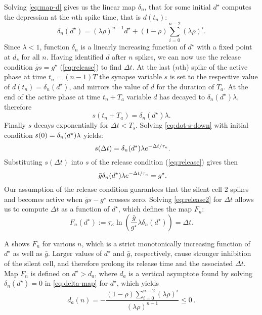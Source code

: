 Solving \cref{eq:map-d} gives us the linear map $\delta_n$, that for some initial $d^\star$ computes the depression at the $n$th spike time, that is $d(t_n)$:
\begin{equation}
	\label{eq:delta-map}
	\delta_n(d^\star) = (\lambda \rho)^{n-1} d^\star + (1-\rho)\sum_{i=0}^{n-2}(\lambda \rho)^i.
\end{equation}
Since $\lambda < 1$, function $\delta_n$ is a linearly increasing function of $d^\star$ with a fixed point at $d_s$ for all $n$.
Having identified $d$ after $n$ spikes, we can now use the release condition $\bar g s = g^{\star}$ (\cref{eq:release}) to find $\Delta t$.
At the last ($n$th) spike of the active phase at time $t_n = (n-1)T$ the synapse variable $s$ is set to the respective value of $d(t_n) = \delta_n(d^\star)$, and mirrors the value of $d$ for the duration of $T_{a}$.
At the end of the active phase at time $t_n + T_{a}$ variable $d$ has decayed to $\delta_n(d^\star) \lambda$, therefore
\begin{equation}
	s(t_n + T_{a})=\delta_n(d^\star)\lambda.
\end{equation}
Finally $s$ decays exponentially for $\Delta t < T_{s}$.
Solving \cref{eq:dot-s-down} with initial condition $s(0)=\delta_n(d^\star)\lambda$ yields:
\begin{equation}
	~\label{eq:s-sol}
	s(\Delta t)=\delta_n(d^\star) \lambda e^{-\Delta t/\tau_\kappa}.
\end{equation}
Substituting $s(\Delta t)$ into $s$ of the release condition (\cref{eq:release}) gives then
\begin{equation}
	~\label{eq:release2}
	\bar g \delta_n(d^\star) \lambda e^{-\Delta t/\tau_\kappa}=g^{\star}.
\end{equation}
Our assumption of the release condition guarantees that the silent cell 2 spikes and becomes active when $\bar g s - g^{\star}$ crosses zero.
Solving \cref{eq:release2} for $\Delta t$ allows us to compute $\Delta t$ as a function of $d^{\star}$, which defines the map $F_{n}$:
\begin{equation}
	\label{eq:Fn-map}
	F_n(d^\star):=\tau_\kappa \ln{\left(\frac{\bar g }{g^\star} \lambda \delta_{n}(d^\star)\right)}= \Delta t.
\end{equation}

A shows $F_n$ for various $n$, which is a strict monotonically increasing function of $d^{\star}$ as well as $\bar g$.
Larger values of $d^{\star}$ and $\bar g$, respectively, cause stronger inhibition of the silent cell, and therefore prolong its release time and the associated $\Delta t$.
Map $F_n$ is defined on $d^{\star}>d_{a}$, where $d_{a}$ is a vertical asymptote found by solving $\delta_{n}(d^\star)=0$ in \cref{eq:delta-map} for $d^\star$, which yields
\begin{equation}
	d_{a}(n)=-\frac{(1-\rho)\sum_{i=0}^{n-2}(\lambda \rho)^{i}}{ (\lambda \rho)^{n-1} }\leq 0~\label{eq:da}.
\end{equation}

